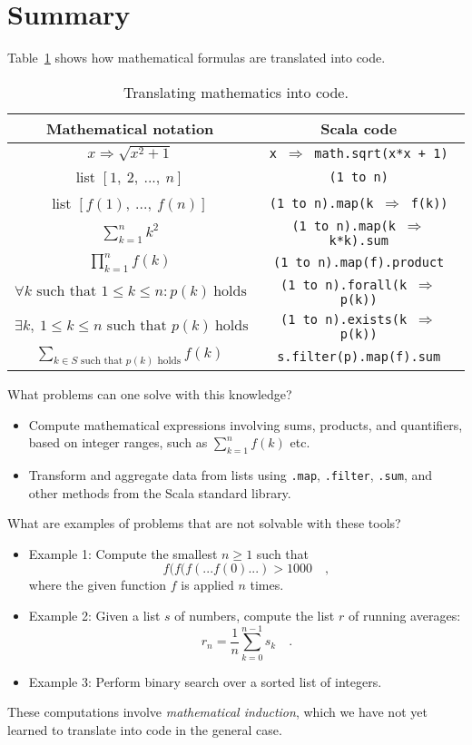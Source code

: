 \section{Summary}

Table~\ref{tab:translating-mathematics-into-code} shows how mathematical
formulas are translated into code.

\begin{table}
\begin{centering}
\begin{tabular}{|c|c|}
\hline 
\textbf{Mathematical notation} & \textbf{Scala code}\tabularnewline
\hline 
\hline 
$x\Rightarrow\sqrt{x^{2}+1}$ & \texttt{x $\Rightarrow$ math.sqrt(x{*}x + 1)}\tabularnewline
\hline 
list $\left[1,~2,~...,~n\right]$ & \texttt{(1 to n)}\tabularnewline
\hline 
list $\left[f(1),~...,~f(n)\right]$ & \texttt{(1 to n).map(k $\Rightarrow$ f(k))}\tabularnewline
\hline 
$\sum_{k=1}^{n}k^{2}$ & \texttt{(1 to n).map(k $\Rightarrow$ k{*}k).sum}\tabularnewline
\hline 
$\prod_{k=1}^{n}f(k)$ & \texttt{(1 to n).map(f).product}\tabularnewline
\hline 
$\forall k\text{ such that }1\leq k\leq n:p(k)~\text{holds}$ & \texttt{(1 to n).forall(k $\Rightarrow$ p(k))}\tabularnewline
\hline 
$\exists k,\:1\leq k\leq n\text{ such that }p(k)~\text{holds}$ & \texttt{(1 to n).exists(k $\Rightarrow$ p(k))}\tabularnewline
\hline 
${\displaystyle \sum_{k\in S\text{ such that }p(k)\text{ holds}}}f(k)$ & \texttt{s.filter(p).map(f).sum}\tabularnewline
\hline 
\end{tabular}
\par\end{centering}
\caption{Translating mathematics into code.\label{tab:translating-mathematics-into-code}}
\end{table}

What problems can one solve with this knowledge?
\begin{itemize}
\item Compute mathematical expressions involving sums, products, and quantifiers,
based on integer ranges, such as $\sum_{k=1}^{n}f(k)$ etc.
\item Transform and aggregate data from lists using \lstinline!.map!,
\lstinline!.filter!,\textbf{
}\lstinline!.sum!, and
other methods from the Scala standard library.
\end{itemize}
What are examples of problems that are not solvable with these tools?
\begin{itemize}
\item Example 1: Compute the smallest $n\geq1$ such that 
\[
f(f(f(...f(0)...)>1000\quad,
\]
where the given function $f$ is applied $n$ times.
\item Example 2: Given a list $s$ of numbers, compute the list $r$ of
running averages: 
\[
r_{n}=\frac{1}{n}\sum_{k=0}^{n-1}s_{k}\quad.
\]
\item Example 3: Perform binary search over a sorted list of integers.
\end{itemize}
These computations involve \emph{mathematical induction},
which we have not yet learned to translate into code in the general
case.

